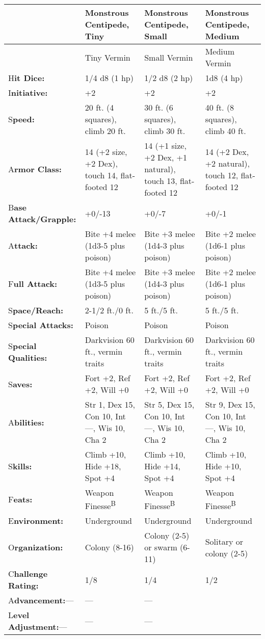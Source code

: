 \documentclass{article}
\begin{document}
\begin{tabular}{|>{\raggedright}p{54pt}|>{\raggedright}p{82pt}|>{\raggedright}p{82pt}|>{\raggedright}p{82pt}|}
\hline
  & M\textbf{onstrous Centipede, Tiny} & M\textbf{onstrous Centipede, Small} & M\textbf{onstrous 
Centipede, Medium}\tabularnewline
\hline
  & Tiny Vermin & Small Vermin & Medium Vermin\tabularnewline
\hline
H\textbf{it Dice:} & 1/4 d8 (1 hp) & 1/2 d8 (2 hp) & 1d8 (4 hp)\tabularnewline
\hline
I\textbf{nitiative:} & +2 & +2 & +2\tabularnewline
\hline
S\textbf{peed:} & 20 ft. (4 squares), climb 20 ft. & 30 ft. (6 squares), climb 
30 ft. & 40 ft. (8 squares), climb 40 ft.\tabularnewline
\hline
A\textbf{rmor Class:} & 14 (+2 size, +2 Dex), touch 14, flat-footed 12 & 14 (+1 
size, +2 Dex, +1 natural), touch 13, flat-footed 12 & 14 (+2 Dex, +2 natural), 
touch 12, flat-footed 12\tabularnewline
\hline
B\textbf{ase Attack/Grapple:} & +0/-13 & +0/-7 & +0/-1\tabularnewline
\hline
A\textbf{ttack:} & Bite +4 melee (1d3-5 plus poison) & Bite +3 melee (1d4-3 plus 
poison) & Bite +2 melee (1d6-1 plus poison)\tabularnewline
\hline
F\textbf{ull Attack:} & Bite +4 melee (1d3-5 plus poison) & Bite +3 melee (1d4-3 
plus poison) & Bite +2 melee (1d6-1 plus poison)\tabularnewline
\hline
S\textbf{pace/Reach:} & 2-1/2 ft./0 ft. & 5 ft./5 ft. & 5 ft./5 ft.\tabularnewline
\hline
S\textbf{pecial Attacks:} & Poison & Poison & Poison\tabularnewline
\hline
S\textbf{pecial Qualities:} & Darkvision 60 ft., vermin traits & Darkvision 60 
ft., vermin traits & Darkvision 60 ft., vermin traits\tabularnewline
\hline
S\textbf{aves:} & Fort +2, Ref +2, Will +0 & Fort +2, Ref +2, Will +0 & Fort +2, 
Ref +2, Will +0\tabularnewline
\hline
A\textbf{bilities:} & Str 1, Dex 15, Con 10, Int ---, Wis 10, Cha 2 & Str 5, Dex 
15, Con 10, Int ---, Wis 10, Cha 2 & Str 9, Dex 15, Con 10, Int ---, Wis 10, Cha 
2\tabularnewline
\hline
S\textbf{kills:} & Climb +10, Hide +18, Spot +4 & Climb +10, Hide +14, Spot +4 & Climb 
+10, Hide +10, Spot +4\tabularnewline
\hline
F\textbf{eats:} & Weapon Finesse\textsuperscript{B} & Weapon Finesse\textsuperscript{B} & Weapon 
Finesse\textsuperscript{B}\tabularnewline
\hline
E\textbf{nvironment:} & Underground & Underground & Underground\tabularnewline
\hline
O\textbf{rganization:} & Colony (8-16) & Colony (2-5) or swarm (6-11) & Solitary 
or colony (2-5)\tabularnewline
\hline
C\textbf{hallenge Rating:} & 1/8 & 1/4 & 1/2\tabularnewline
\hline
A\textbf{dvancement:}--- & --- & --- & \tabularnewline
\hline
L\textbf{evel Adjustment:}--- & --- & --- & \tabularnewline
\hline
\end{tabular}
\end{document}
